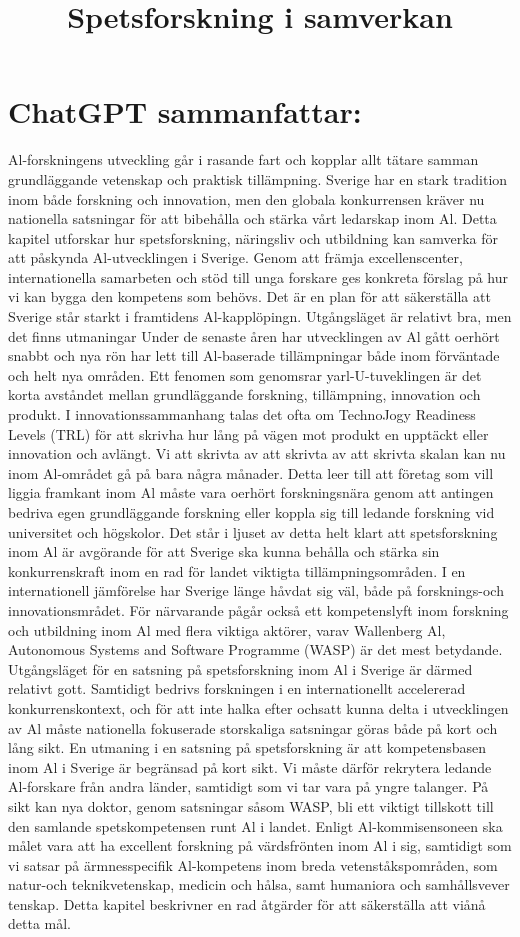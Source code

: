 {{{{{\title{
Spetsforskning i samverkan
}
\section*{ChatGPT sammanfattar:}
Al-forskningens utveckling går i rasande fart och kopplar allt tätare samman grundläggande vetenskap och praktisk tillämpning. Sverige har en stark tradition inom både forskning och innovation, men den globala konkurrensen kräver nu nationella satsningar för att bibehålla och stärka vårt ledarskap inom Al.
Detta kapitel utforskar hur spetsforskning, näringsliv och utbildning kan samverka för att påskynda Al-utvecklingen i Sverige. Genom att främja excellenscenter, internationella samarbeten och stöd till unga forskare ges konkreta förslag på hur vi kan bygga den kompetens som behövs. Det är en plan för att säkerställa att Sverige står starkt i framtidens Al-kapplöpingn.
Utgångsläget är relativt bra, men det finns utmaningar
Under de senaste åren har utvecklingen av Al gått oerhört snabbt och nya rön har lett till Al-baserade tillämpningar både inom förväntade och helt nya områden. Ett fenomen som genomsrar yarl-U-tuveklingen är det korta avståndet mellan grundläggande forskning, tillämpning, innovation och produkt. I innovationssammanhang talas det ofta om TechnoJogy Readiness Levels (TRL) för att skrivha hur lång på vägen mot produkt en upptäckt eller innovation och avlängt. Vi att skrivta av att skrivta av att skrivta skalan kan nu inom Al-området gå på bara några månader. Detta leer till att företag som vill liggia framkant inom Al måste vara oerhört forskningsnära genom att antingen bedriva egen grundläggande forskning eller koppla sig till ledande forskning vid universitet och högskolor. Det står i ljuset av detta helt klart att spetsforskning inom Al är avgörande för att Sverige ska kunna behålla och stärka sin konkurrenskraft inom en rad för landet viktigta tillämpningsområden.
I en internationell jämförelse har Sverige länge håvdat sig väl, både på forsknings-och innovationsmrådet. För närvarande pågår också ett kompetenslyft inom forskning och utbildning inom Al med flera viktiga aktörer, varav Wallenberg Al, Autonomous Systems and Software Programme (WASP) är det mest betydande.
Utgångsläget för en satsning på spetsforskning inom Al i Sverige är därmed relativt gott. Samtidigt bedrivs forskningen i en internationellt accelererad konkurrenskontext, och för att inte halka efter ochsatt kunna delta i utvecklingen av Al måste nationella
fokuserade storskaliga satsningar göras både på kort och lång sikt.
En utmaning i en satsning på spetsforskning är att kompetensbasen inom Al i Sverige är begränsad på kort sikt. Vi måste därför rekrytera ledande Al-forskare från andra länder, samtidigt som vi tar vara på yngre talanger. På sikt kan nya doktor, genom satsningar såsom WASP, bli ett viktigt tillskott till den samlande spetskompetensen runt Al i landet. Enligt Al-kommisensoneen ska målet vara att ha excellent forskning på värdsfrönten inom Al i sig, samtidigt som vi satsar på ärmnesspecifik Al-kompetens inom breda vetenståkspområden, som natur-och teknikvetenskap, medicin och hålsa, samt humaniora och samhållsvever tenskap. Detta kapitel beskrivner en rad åtgärder för att säkerställa att viånå detta mål.
}}}}}
